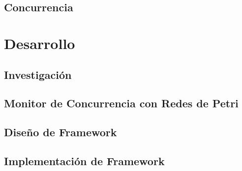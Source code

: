 \documentclass{report}
\begin{document}
        \chapter{Concurrencia}
            

    \part{Desarrollo}
        \chapter{Investigación}
            
        \chapter{Monitor de Concurrencia con Redes de Petri}
        	\label{cap:petri_monitor}
            
        \chapter{Diseño de \nombreFramework  Framework}
        	\label{cap:diseno_framework}
            
            
            
            
            
        \chapter{Implementación de \nombreFramework  Framework}
        	
    
	
\end{document}

